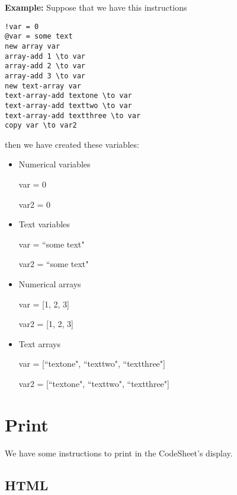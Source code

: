 \documentclass[11pt,a4paper,openright,oneside]{book}
\newenvironment{ex}
{
  \setlength{\parindent}{0cm}
  \large \textbf{Example:} \normalsize 
}
{}
\begin{document}
\begin{ex} Suppose that we have this instructions
  \begin{lstlisting}
!var = 0
@var = some text
new array var
array-add 1 \to var
array-add 2 \to var
array-add 3 \to var
new text-array var
text-array-add textone \to var
text-array-add texttwo \to var
text-array-add textthree \to var
copy var \to var2
  \end{lstlisting}
  then we have created these variables:
  \begin{itemize}
    \item Numerical variables
      \begin{center} \textsf{var = 0} \end{center}
      \begin{center} \textsf{var2 = 0} \end{center}
    \item Text variables
      \begin{center} \textsf{var = ``some text"} \end{center}
      \begin{center} \textsf{var2 = ``some text"} \end{center}
    \item Numerical arrays
      \begin{center} \textsf{var = [1, 2, 3]} \end{center}
      \begin{center} \textsf{var2 = [1, 2, 3]} \end{center}
    \item Text arrays
      \begin{center} \textsf{var = [``textone", ``texttwo", ``textthree"]} \end{center}
      \begin{center} \textsf{var2 = [``textone", ``texttwo", ``textthree"]} \end{center}
  \end{itemize}
\end{ex}

\section{Print}

We have some instructions to print in the CodeSheet's display. 

\subsection{HTML}
\end{document}
